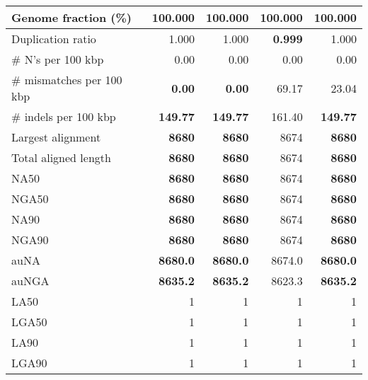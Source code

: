 \documentclass[12pt,a4paper]{article}
\begin{document}
\begin{table}[ht]
\begin{center}
\begin{tabular}{|l*{4}{|r}|}
Genome fraction (\%) & 100.000 & 100.000 & 100.000 & 100.000 \\ \hline
Duplication ratio & 1.000 & 1.000 & {\bf 0.999} & 1.000 \\ \hline
\# N's per 100 kbp & 0.00 & 0.00 & 0.00 & 0.00 \\ \hline
\# mismatches per 100 kbp & {\bf 0.00} & {\bf 0.00} & 69.17 & 23.04 \\ \hline
\# indels per 100 kbp & {\bf 149.77} & {\bf 149.77} & 161.40 & {\bf 149.77} \\ \hline
Largest alignment & {\bf 8680} & {\bf 8680} & 8674 & {\bf 8680} \\ \hline
Total aligned length & {\bf 8680} & {\bf 8680} & 8674 & {\bf 8680} \\ \hline
NA50 & {\bf 8680} & {\bf 8680} & 8674 & {\bf 8680} \\ \hline
NGA50 & {\bf 8680} & {\bf 8680} & 8674 & {\bf 8680} \\ \hline
NA90 & {\bf 8680} & {\bf 8680} & 8674 & {\bf 8680} \\ \hline
NGA90 & {\bf 8680} & {\bf 8680} & 8674 & {\bf 8680} \\ \hline
auNA & {\bf 8680.0} & {\bf 8680.0} & 8674.0 & {\bf 8680.0} \\ \hline
auNGA & {\bf 8635.2} & {\bf 8635.2} & 8623.3 & {\bf 8635.2} \\ \hline
LA50 & 1 & 1 & 1 & 1 \\ \hline
LGA50 & 1 & 1 & 1 & 1 \\ \hline
LA90 & 1 & 1 & 1 & 1 \\ \hline
LGA90 & 1 & 1 & 1 & 1 \\ \hline
\end{tabular}
\end{center}
\end{table}
\end{document}
